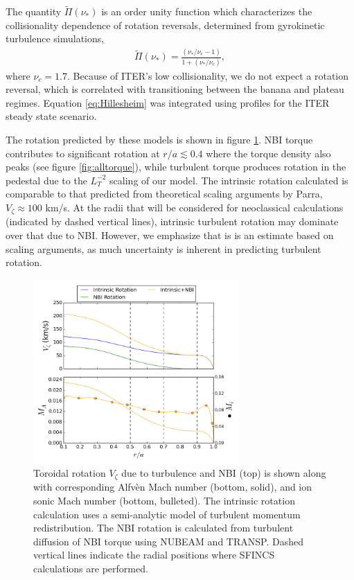 \documentclass[aip, pop, preprint]{revtex4-1}
\numberwithin{figure}{section}
\numberwithin{equation}{section}
\begin{document}
The quantity $\widetilde{\Pi} (\nu_*)$ is an order unity function which characterizes the collisionality dependence of rotation reversals, determined from gyrokinetic turbulence simulations,\cite{Barnes2013}
\begin{gather}
\widetilde{\Pi} (\nu_*) = \frac{(\nu_*/\nu_c -1)}{1 + (\nu_*/\nu_c)},
\end{gather}
where $\nu_c = 1.7$. Because of ITER's low collisionality, we do not expect a rotation reversal, which is correlated with transitioning between the banana and plateau regimes. Equation \ref{eq:Hillesheim} was integrated using profiles for the ITER steady state scenario. 

The rotation predicted by these models is shown in figure \ref{fig:rotation_estimate}. NBI torque contributes to significant rotation at $r/a \lesssim 0.4$ where the torque density also peaks (see figure \ref{fig:alltorque}), while turbulent torque produces rotation in the pedestal due to the $L_T^{-2}$ scaling of our model.  The intrinsic rotation calculated is comparable to that predicted from theoretical scaling arguments by Parra,\cite{Parra2012} $V_{\zeta} \approx 100$ km/s. At the radii that will be considered for neoclassical calculations (indicated by dashed vertical lines), intrinsic turbulent rotation may dominate over that due to NBI. However, we emphasize that is is an estimate based on scaling arguments, as much uncertainty is inherent in predicting turbulent rotation. 

\FloatBarrier

\begin{figure}[h!]
\centering
\includegraphics[width=0.7\textwidth]{rotationestimate.png}
\caption{\label{fig:rotation_estimate} Toroidal rotation $V_{\zeta}$ due to turbulence and NBI (top) is shown along with  corresponding Alfv\`{e}n Mach number (bottom, solid), and ion sonic Mach number (bottom, bulleted). The intrinsic rotation calculation uses a semi-analytic model of turbulent momentum redistribution.\cite{Hillesheim2015} The NBI rotation is calculated from turbulent diffusion of NBI torque using NUBEAM and TRANSP.\cite{Poli2014} Dashed vertical lines indicate the radial positions where SFINCS calculations are performed. }
\end{figure}
\end{document}
